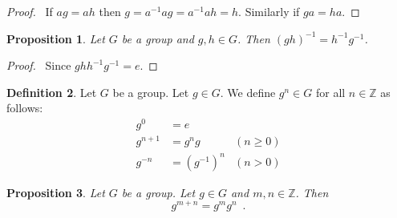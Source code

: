 \documentclass{book}
\let\qed\relax
\newtheorem{prop}{Proposition}[chapter]
\theoremstyle{definition}
\newtheorem{df}[prop]{Definition}
\newcommand{\inv}[1]{\ensuremath{{#1}^{-1}}}
\begin{document}
\begin{proof}
    \pf\ If $ag = ah$ then $g = \inv{a} a g = \inv{a} a h = h$. Similarly if $ga = ha$. \qed
\end{proof}

\begin{prop}
    Let $G$ be a group and $g,h \in G$. Then $(gh)^{-1} = h^{-1}g^{-1}$.
\end{prop}

\begin{proof}
    \pf\ Since $ghh^{-1}g^{-1} = e$. \qed
\end{proof}

\begin{df}
    Let $G$ be a group. Let $g \in G$. We define $g^n \in G$ for all $n \in \mathbb{Z}$ as follows:
    \begin{align*}
        g^0     & = e                       \\
        g^{n+1} & = g^n g      & (n \geq 0) \\
        g^{-n}  & = (g^{-1})^n & (n > 0)
    \end{align*}
\end{df}

\begin{prop}
    \label{prop:power-add}
    Let $G$ be a group. Let $g \in G$ and $m,n \in \mathbb{Z}$. Then
    \[ g^{m+n} = g^m g^n \enspace . \]
\end{prop}
\end{document}
